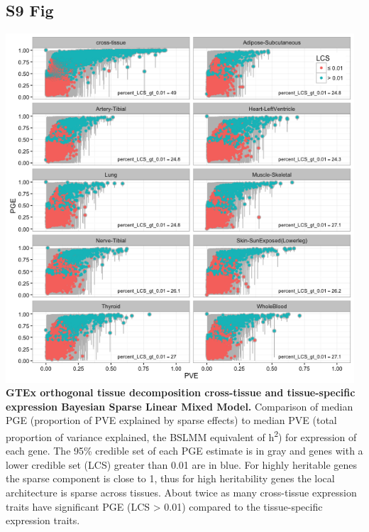 \documentclass[10pt,letterpaper]{article}
\begin{document}
\begin{singlespace}
\subsection*{S9 Fig}
\includegraphics[width=13cm]{Figures/GenArch_Supp/S5Fig.png}
\label{S9_Fig}
{\bf GTEx orthogonal tissue decomposition cross-tissue and tissue-specific expression Bayesian Sparse Linear Mixed Model.} Comparison of median PGE (proportion of PVE explained by sparse effects) to median PVE (total proportion of variance explained, the BSLMM equivalent of h\textsuperscript{2}) for expression of each gene. The 95\% credible set of each PGE estimate is in gray and genes with a lower credible set (LCS) greater than 0.01 are in blue. For highly heritable genes the sparse component is close to 1, thus for high heritability genes the local architecture is sparse across tissues. About twice as many cross-tissue expression traits have significant PGE (LCS \textgreater{} 0.01) compared to the tissue-specific expression traits.


\end{singlespace}
\end{document}
